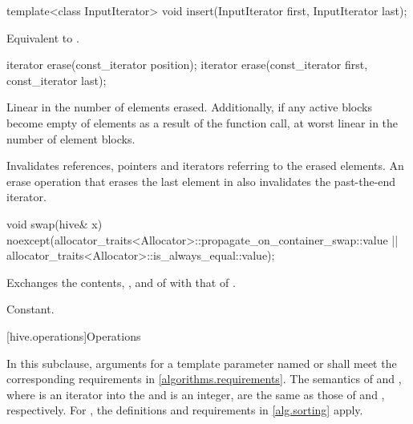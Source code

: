 %
\begin{itemdecl}
template<class InputIterator>
  void insert(InputIterator first, InputIterator last);
\end{itemdecl}

\begin{itemdescr}
\pnum
\effects
Equivalent to .
\end{itemdescr}

%
\begin{itemdecl}
iterator erase(const_iterator position);
iterator erase(const_iterator first, const_iterator last);
\end{itemdecl}

\begin{itemdescr}
\pnum
\complexity
Linear in the number of elements erased.
Additionally, if any active blocks become empty of elements
as a result of the function call,
at worst linear in the number of element blocks.

\pnum
\remarks
Invalidates references, pointers and iterators
referring to the erased elements.
An erase operation that erases the last element in 
also invalidates the past-the-end iterator.
\end{itemdescr}

%
\begin{itemdecl}
void swap(hive& x)
  noexcept(allocator_traits<Allocator>::propagate_on_container_swap::value ||
           allocator_traits<Allocator>::is_always_equal::value);
\end{itemdecl}

\begin{itemdescr}
\pnum
\effects
Exchanges the contents, , and 
of  with that of .

\pnum
\complexity
Constant.
\end{itemdescr}

[hive.operations]{Operations}

In this subclause,
arguments for a template parameter
named  or 
shall meet the corresponding requirements in \ref{algorithms.requirements}.
The semantics of  and ,
where  is an iterator into the  and  is an integer,
are the same as those of  and , respectively.
For , the definitions and requirements in \ref{alg.sorting} apply.

